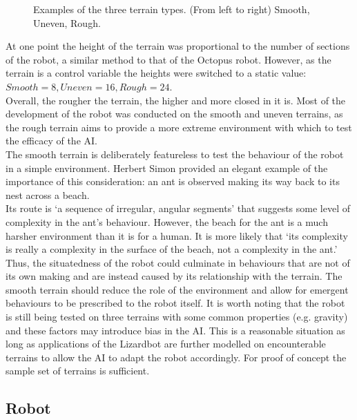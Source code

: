 \documentclass{article}
\begin{document}
\begin{figure}[H]
\caption{Examples of the three terrain types. (From left to right) Smooth, Uneven, Rough.}
\end{figure}
At one point the height of the terrain was proportional to the number of sections of the robot, a similar method to that of the Octopus robot. However, as the terrain is a control variable the heights were switched to a static value: $Smooth=8, Uneven=16, Rough=24$.\\
Overall, the rougher the terrain, the higher and more closed in it is. Most of the development of the robot was conducted on the smooth and uneven terrains, as the rough terrain aims to provide a more extreme environment with which to test the efficacy of the AI.\\
The smooth terrain is deliberately featureless to test the behaviour of the robot in a simple environment. Herbert Simon provided an elegant example of the importance of this consideration: an ant is observed making its way back to its nest across a beach.\\
Its route is ‘a sequence of irregular, angular segments’ that suggests some level of complexity in the ant's behaviour. However, the beach for the ant is a much harsher environment than it is for a human. It is more likely that ‘its complexity is really a complexity in the surface of the beach, not a complexity in the ant.’  Thus, the situatedness of the robot could culminate in behaviours that are not of its own making and are instead caused by its relationship with the terrain. The smooth terrain should reduce the role of the environment and allow for emergent behaviours to be prescribed to the robot itself. It is worth noting that the robot is still being tested on three terrains with some common properties (e.g. gravity) and these factors may introduce bias in the AI. This is a reasonable situation as long as applications of the Lizardbot are further modelled on encounterable terrains to allow the AI to adapt the robot accordingly. For proof of concept the sample set of terrains is sufficient.

\subsection{Robot}
\end{document}
